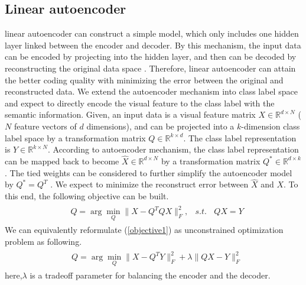 \documentclass[review]{elsarticle}
\begin{document}
\subsection{Linear autoencoder}
linear autoencoder can construct a simple model, which only includes one hidden layer linked between the encoder and decoder. By this mechanism, the input data can be encoded by projecting into the hidden layer, and then can be decoded by reconstructing the original data space \cite{Kodirov2017}. Therefore, linear autoencoder can attain the better coding quality with minimizing the error between the original and reconstructed data. We extend the autoencoder mechanism into class label space and expect to directly encode the visual feature to the class label with the semantic information. Given, an input data is a visual feature matrix $X\in \mathbb{R}^{d\times N}$ ($N$ feature vectors of $d$ dimensions), and can be projected into a $k$-dimension class label space by a transformation matrix $Q \in \mathbb{R}^{k\times d}$. The class label representation is $Y \in \mathbb{R}^{k \times N}$. According to autoencoder mechanism, the class label representation can be mapped back to become $\hat{X} \in \mathbb{R}^{d \times N}$ by a transformation matrix $Q^{*} \in \mathbb{R}^{d\times k}$. The tied weights can be considered to further simplify the autoencoder model by $Q^{*}=Q^{T}$ \cite{Ranzato2007Sparse}. We expect to minimize the reconstruct error between $\hat{X}$ and $X$. To this end, the following objective can be built.
 \begin{align}
\label{objective1}
\begin{aligned}
&Q=\arg \min_{Q}\|X-Q^{T}QX\|^{2}_{F},&s.t.~~~~QX=Y
 \end{aligned}
\end{align}
We can equivalently reformulate (\ref{objective1}) as unconstrained optimization problem as following.
 \begin{align}
\label{objective11}
\begin{aligned}
&Q=\arg \min_{Q}\|X-Q^{T}Y\|^{2}_{F}+\lambda\|QX-Y\|^{2}_{F}
 \end{aligned}
\end{align}
here,$\lambda$ is a tradeoff parameter for balancing the encoder and the decoder.
\end{document}
